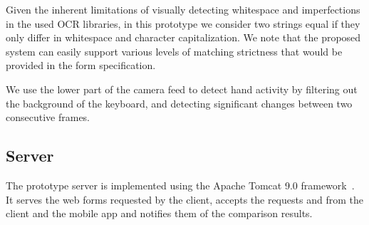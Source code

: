 Given the inherent limitations of visually detecting whitespace and imperfections in the used OCR libraries, in this prototype we consider two strings equal if they only differ in whitespace and character capitalization.
We note that the proposed system can easily support various levels of matching strictness that would be provided in the form specification.

We use the lower part of the camera feed to detect hand activity by filtering out the background of the keyboard, and detecting significant changes between two consecutive frames.

\subsection{Server}


The prototype server is implemented using the Apache Tomcat 9.0 framework~\cite{ApacheTomcat}. %
It serves the web forms requested by the client, accepts the requests and \POI from the client and the mobile app and notifies them of the comparison results.




